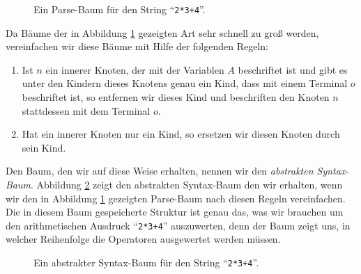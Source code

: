 \begin{figure}[!ht]
  \centering
  \caption{Ein Parse-Baum f\"ur den String ``\texttt{2*3+4}''.}
  \label{fig:parse-tree.dot}
\end{figure}

Da B\"aume der in Abbildung \ref{fig:parse-tree.dot} gezeigten Art sehr schnell zu gro{\ss}
werden, vereinfachen wir diese B\"aume mit Hilfe der folgenden Regeln:
\begin{enumerate}
\item Ist $n$ ein innerer Knoten, der mit der Variablen $A$ beschriftet ist
      und gibt es unter den Kindern dieses Knotens genau ein Kind, dass mit einem Terminal $o$
      beschriftet ist,  so entfernen wir dieses Kind und beschriften den Knoten $n$ stattdessen mit dem
      Terminal $o$.
\item Hat ein innerer Knoten nur ein Kind, so ersetzen wir diesen Knoten durch sein Kind.
\end{enumerate}
Den Baum, den wir auf diese Weise erhalten, nennen wir den \emph{abstrakten Syntax-Baum}.
Abbildung \ref{fig:abstract-syntax-tree.dot} zeigt den abstrakten Syntax-Baum den wir
erhalten, wenn wir den in Abbildung \ref{fig:parse-tree.dot} gezeigten Parse-Baum nach
diesen Regeln vereinfachen.  Die in diesem Baum gespeicherte Struktur ist genau das, was
wir brauchen um den arithmetischen Ausdruck ``\texttt{2*3+4}'' auszuwerten, denn der Baum zeigt uns,
in welcher Reihenfolge die Operatoren ausgewertet werden m\"ussen.

\begin{figure}[!ht]
  \centering
  \caption{Ein abstrakter Syntax-Baum f\"ur den String ``\texttt{2*3+4}''.}
  \label{fig:abstract-syntax-tree.dot}
\end{figure}


